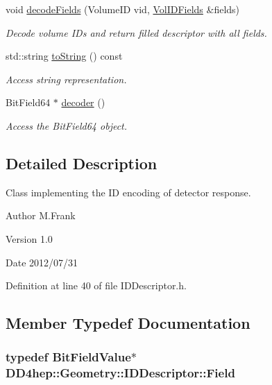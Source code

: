 \begin{DoxyCompactItemize}
void \hyperlink{class_d_d4hep_1_1_geometry_1_1_i_d_descriptor_ad946d0b1977723b917f4092cf039235c}{decodeFields} (VolumeID vid, \hyperlink{class_d_d4hep_1_1_geometry_1_1_i_d_descriptor_a6c4700a96f3a202eedaa25e54d5695ff}{VolIDFields} \&fields)
\begin{DoxyCompactList}\small\item\em Decode volume IDs and return filled descriptor with all fields. \item\end{DoxyCompactList}\item 
std::string \hyperlink{class_d_d4hep_1_1_geometry_1_1_i_d_descriptor_ad147d0eaa67a3a248c35d86b7aa7a4b7}{toString} () const 
\begin{DoxyCompactList}\small\item\em Access string representation. \item\end{DoxyCompactList}\item 
BitField64 $\ast$ \hyperlink{class_d_d4hep_1_1_geometry_1_1_i_d_descriptor_ac62f98d6db97a51cadb2f17c58369d18}{decoder} ()
\begin{DoxyCompactList}\small\item\em Access the BitField64 object. \item\end{DoxyCompactList}\end{DoxyCompactItemize}


\subsection{Detailed Description}
Class implementing the ID encoding of detector response. \begin{DoxyAuthor}{Author}
M.Frank 
\end{DoxyAuthor}
\begin{DoxyVersion}{Version}
1.0 
\end{DoxyVersion}
\begin{DoxyDate}{Date}
2012/07/31 
\end{DoxyDate}


Definition at line 40 of file IDDescriptor.h.

\subsection{Member Typedef Documentation}
\hypertarget{class_d_d4hep_1_1_geometry_1_1_i_d_descriptor_ac06f5915e74f8a8f2ff73e9a322556e4}{
\subsubsection[{Field}]{\setlength{\rightskip}{0pt plus 5cm}typedef BitFieldValue$\ast$ {\bf DD4hep::Geometry::IDDescriptor::Field}}}
\label{class_d_d4hep_1_1_geometry_1_1_i_d_descriptor_ac06f5915e74f8a8f2ff73e9a322556e4}


